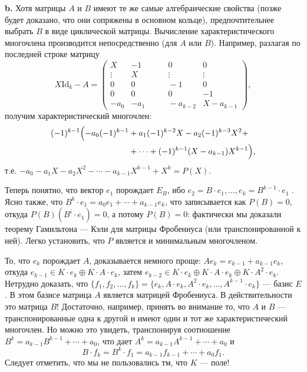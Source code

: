 \documentclass{mai_book}
\begin{document}
\textbf{b. } Хотя матрицы $A$ и $B$ имеют те же самые алгебраические  свойства (позже будет доказано, что они сопряжены в основном кольце), предпочтительнее выбрать $B$ в виде циклической матрицы. Вычисление характеристического многочлена производится непосредственно (для $A$ или $B$). Например, разлагая по последней строке матрицу
\begin{equation*} 
	X\text{Id}_k - A =
	\begin{pmatrix}
		X & -1 & \qquad 0 & 0 \\
		\vdots & X & \qquad \vdots & \vdots \\
		0 & 0 & \qquad -1 & 0 \\
		0 & 0 & \qquad 0 & -1 \\
		-a_0 & -a_1 & \qquad -a_{k-2} & X - a_{k-1}
	\end{pmatrix},
\end{equation*}
получим характеристический многочлен:
\begin{align*}
	(-1)^{k-1} \Bigl( -a_0(-1)^{k-1} &+ a_1 (-1)^{k-2}X - a_2(-1)^{k-3}X^2 + \\
	&+ \cdots + (-1)^{k-1}(X-a_{k-1})X^{k-1} \Bigr),
\end{align*}
т.е. $-a_0-a_1 X - a_2 X^2 - \cdots - a_{k-1}X^{k-1} + X^k = P(X)$. \par
Теперь понятно, что вектор $e_1$ порождает $E_B$, ибо $e_2 = B \cdot e_1, \dots, e_k = B^{k-1} \cdot e_1$ . Ясно также, что $B^k \cdot e_1 = a_0 e_1 + \cdots + a_{k-1}e_k$, что  записывается как $P(B) = 0$, откуда $P(B)(B^i \cdot e_1) = 0$, а потому $P(B) = 0$: фактически мы доказали теорему Гамильтона — Кэли для матрицы Фробениуса (или транспонированной к ней). Легко установить, что $P$ является и минимальным многочленом. \par
То, что $e_k$ порождает $A$, доказывается немного проще: $A e_k = e_{k-1}+a_{k-1}e_k$, откуда $e_{k-1} \in K \cdot e_k \oplus K \cdot A \cdot e_k$, затем $e_{k-2} \in K \cdot e_k \oplus K \cdot A \cdot e_k \oplus K \cdot A^2 \cdot e_k$. Нетрудно доказать, что $\{f_1,f_2,\dots,f_k\} = \{e_k, A \cdot e_k, A^2 \cdot e_k, \dots, A^{k-1} \cdot e_k\}$ --- базис $E$. В этом базисе матрица $A$ является матрицей Фробениуса. В действительности это матрица $B!$ Достаточно,  например, принять во внимание то, что $A$ и $B$ — транспонированные одна к другой и имеют один и тот же характеристический многочлен. Но можно это увидеть, транспонируя соотношение $B^k = a_{k-1}B^{k-1}+\cdots+a_0$, что дает $A^k = a_{k-1}A^{k-1}+\cdots+a_0$ и
\begin{equation*}
	B \cdot f_k = B^k \cdot f_1 = a_{k-1}f_{k-1}+\cdots+a_0f_1.
\end{equation*}
Следует отметить, что мы не пользовались тм, что $K$ --- поле! \smallskip
\end{document}

